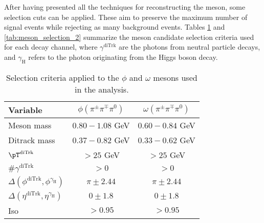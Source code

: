 After having presented all the techniques for reconstructing the meson, some selection cuts can be applied. These aim to preserve the maximum number of signal events while rejecting as many background events. Tables \ref{tab:meson_selection_1} and \ref{tab:meson_selection_2} summarize the meson candidate selection criteria used for each decay channel, where $\gamma^{\text{diTrk}}$ are the photons from neutral particle decays, and $\gamma_\text{H}$ refers to the photon originating from the Higgs boson decay.
\begin{table}[!ht]
    \centering
    \begin{tabular}{|l|c|c|}
        \hline
        \cellcolor{lightgray}Variable & \cellcolor{lightgray}$\phi(\pi^{\pm}\pi^{\mp}\pi^{0})$ & \cellcolor{lightgray}$\omega(\pi^{\pm}\pi^{\mp}\pi^{0})$ \\ \hline
        Meson mass                                              &$0.80-1.08$ GeV  &$0.60-0.84$ GeV    \\
        Ditrack mass                                            &$0.37-0.82$ GeV  &$0.33-0.62$ GeV      \\
        $\pT^{\text{diTrk}}$                                    &$>25$ GeV        &$>25$ GeV              \\
        $\#\gamma^{\text{diTrk}}$                               &$>0$             &$>0$                   \\
        $\Delta(\phi^{\text{diTrk}}, \phi^{\gamma_\text{H}})$   &$\pi\pm2.44$     &$\pi\pm2.44$        \\
        $\Delta(\eta^{\text{diTrk}}, \eta^{\gamma_\text{H}})$   &$0\pm1.8$        &$0\pm1.8$              \\
        Iso                                                     &$>0.95$          &$>0.95$                \\
        \hline
        \end{tabular}
    \caption{Selection criteria applied to the $\phi$ and $\omega$ mesons used in the analysis.}
    \label{tab:meson_selection_1}
\end{table}

